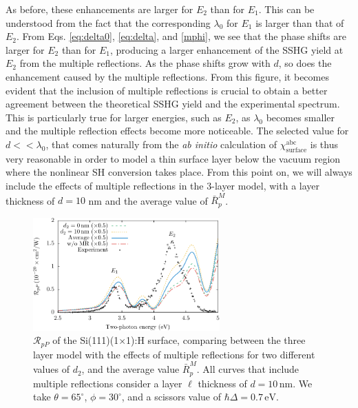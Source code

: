 As before, these enhancements are larger for $E_{2}$ than for $E_{1}$. This can
be understood from the fact that the corresponding $\lambda_{0}$ for $E_{1}$ is
larger than that of $E_{2}$. From Eqs. \eqref{eq:delta0}, \eqref{eq:delta}, and
\eqref{mphi}, we see that the phase shifts are larger for $E_{2}$ than for
$E_{1}$, producing a larger enhancement of the SSHG yield at $E_{2}$ from the
multiple reflections. As the phase shifts grow with $d$, so does the enhancement
caused by the multiple reflections. From this figure, it becomes evident that
the inclusion of multiple reflections is crucial to obtain a better agreement
between the theoretical SSHG yield and the experimental spectrum. This is
particularly true for larger energies, such as $E_{2}$, as $\lambda_{0}$ becomes
smaller and the multiple reflection effects become more noticeable. The selected
value for $d << \lambda_{0}$, that comes naturally from the \emph{ab initio}
calculation of $\chi^{\mathrm{abc}}_{\mathrm{surface}}$ is thus very reasonable
in order to model a thin surface layer below the vacuum region where the
nonlinear SH conversion takes place. From this point on, we will always include
the effects of multiple reflections in the 3-layer model, with a layer thickness
of $d = 10$ nm and the average value of $\bar{R}^{M}_{p}$.

\begin{figure}[t]
\centering
\includegraphics[width=0.64\textwidth]{content/figures/fig-Si1x1-MRdepth}
\caption[Different depths for the placement of the polarization sheet in the
thin layer $\ell$.]
{$\mathcal{R}_{pP}$ of the Si(111)(1$\times$1):H surface, comparing between the
three layer model with the effects of multiple reflections for two different
values of $d_{2}$, and the average value $\bar{R}^{M}_{p}$. All curves that
include multiple reflections consider a layer $\ell$ thickness of $d =
10\,\mathrm{nm}$. We take $\theta=65^{\circ}$, $\phi=30^{\circ}$, and a scissors
value of $\hbar\Delta = 0.7\,\text{eV}$.}
\label{fig:d2values}
\end{figure}

